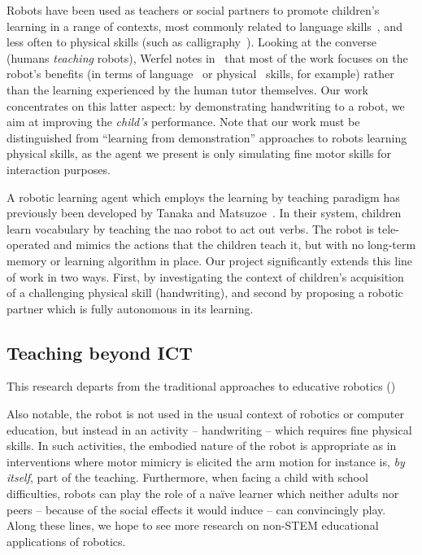 \documentclass{article}
\begin{document}
Robots have been used as teachers or social partners to promote children's
learning in a range of contexts, most commonly related to language
skills~\cite{han2010robot}, and less often to physical skills (such as
calligraphy~\cite{Matsui2013}).  Looking at the converse (humans \emph{teaching}
robots), Werfel notes in~\cite{Werfel2014} that most of the work focuses on the
robot's benefits (in terms of language~\cite{Saunders2010} or
physical~\cite{Mulling2013} skills, for example) rather than the learning
experienced by the human tutor themselves.  Our work concentrates on this latter
aspect: by demonstrating handwriting to a robot, we aim at improving the
\emph{child's} performance. Note that our work must be distinguished from
``learning from demonstration'' approaches to robots learning physical skills,
as the agent we present is only simulating fine motor skills for interaction
purposes.

A robotic learning agent which employs the learning by teaching paradigm has
previously been developed by Tanaka and Matsuzoe~\cite{Tanaka2012}. In their
system, children learn vocabulary by teaching the {\sc nao} robot to act out
verbs. The robot is tele-operated and mimics the actions that the children teach
it, but with no long-term memory or learning algorithm in place.  Our project
significantly extends this line of work in two ways. First, by investigating the
context of children's acquisition of a challenging physical skill (handwriting),
and second by proposing a robotic partner which is fully autonomous in its
learning.


\subsection{Teaching beyond ICT}

This research departs from the traditional approaches to educative robotics
()

Also notable, the robot is not used in the usual context of robotics or computer
education, but instead in an activity -- handwriting -- which requires fine
physical skills. In such activities, the embodied nature of the robot is
appropriate as in interventions where motor mimicry is elicited
\cite{Berninger1997} the arm motion for instance is, \emph{by itself}, part of
the teaching. Furthermore, when facing a child with school difficulties, robots
can play the role of a na\"ive learner which neither adults nor peers -- because
of the social effects it would induce -- can convincingly play. Along these
lines, we hope to see more research on non-STEM educational applications of
robotics.
\end{document}

